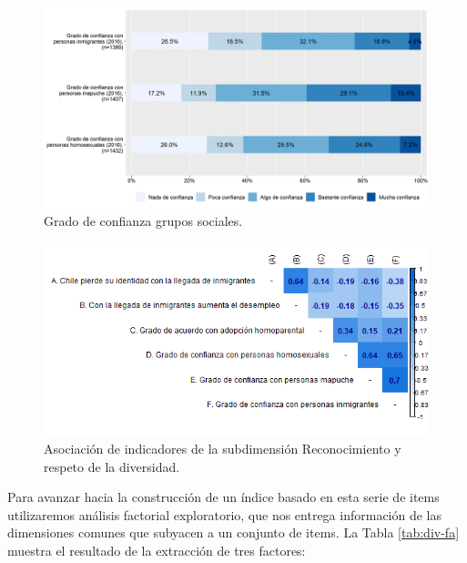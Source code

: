 \documentclass[
  12pt,
]{book}
\begin{document}
\begin{figure}[H]

{\centering \includegraphics[width=1\linewidth,height=1\textheight]{output/graphs/diversidad} 

}

\caption{Grado de confianza grupos sociales.}\label{fig:diversidad}
\end{figure}

\begin{figure}[H]

{\centering \includegraphics[width=1\linewidth,height=1\textheight]{output/graphs/diversidad_cor} 

}

\caption{Asociación de indicadores de la subdimensión Reconocimiento y respeto de la diversidad.}\label{fig:diversidad-cor}
\end{figure}

Para avanzar hacia la construcción de un índice basado en esta serie de items utilizaremos análisis factorial exploratorio, que nos entrega información de las dimensiones comunes que subyacen a un conjunto de items. La Tabla \ref{tab:div-fa} muestra el resultado de la extracción de tres factores:
\end{document}
